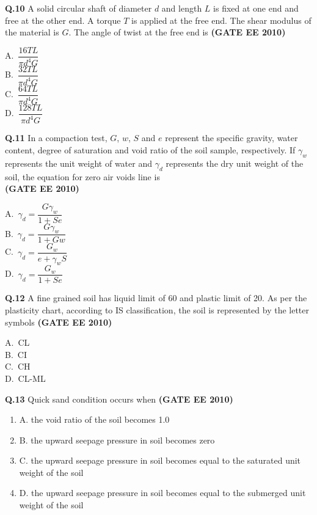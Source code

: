 \documentclass[journal,12pt,onecolumn]{exam}
\theoremstyle{remark}
\begin{document}
\noindent\textbf{Q.10} A solid circular shaft of diameter $d$ and length $L$ is fixed at one end and free at the other end. A torque $T$ is applied at the free end. The shear modulus of the material is $G$. The angle of twist at the free end is 
\hfill\textbf{(GATE EE 2010)}
\begin{multicols}{4}
A.\ $\dfrac{16TL}{\pi d^4 G}$ \\
B.\ $\dfrac{32TL}{\pi d^4 G}$ \\
C.\ $\dfrac{64TL}{\pi d^4 G}$ \\
D.\ $\dfrac{128TL}{\pi d^4 G}$
\end{multicols}

\noindent\textbf{Q.11} In a compaction test, $G$, $w$, $S$ and $e$ represent the specific gravity, water content, degree of saturation and void ratio of the soil sample, respectively. If $\gamma_w$ represents the unit weight of water and $\gamma_d$ represents the dry unit weight of the soil, the equation for zero air voids line is 
\\ \hfill\textbf{(GATE EE 2010)}
\begin{multicols}{4}
A.\ $\gamma_d = \dfrac{G \gamma_w}{1+Se}$ \\
B.\ $\gamma_d = \dfrac{G \gamma_w}{1+Gw}$ \\
C.\ $\gamma_d = \dfrac{G_w}{e+\gamma_w S}$ \\
D.\ $\gamma_d = \dfrac{G_w}{1+Se}$
\end{multicols}

\noindent\textbf{Q.12} A fine grained soil has liquid limit of 60 and plastic limit of 20. As per the plasticity chart, according to IS classification, the soil is represented by the letter symbols 
\hfill\textbf{(GATE EE 2010)}
\begin{multicols}{4}
A.\ CL \\
B.\ CI \\
C.\ CH \\
D.\ CL-ML
\end{multicols}

\noindent\textbf{Q.13} Quick sand condition occurs when 
\hfill\textbf{(GATE EE 2010)}


\begin{enumerate}[label=]
 \item A. the void ratio of the soil becomes 1.0 
 \item B. the upward seepage pressure in soil becomes zero 
 \item C. the upward seepage pressure in soil becomes equal to the saturated unit weight of the soil 
 \item D. the upward seepage pressure in soil becomes equal to the submerged unit weight of the soil
 \end{enumerate}
\end{document}
